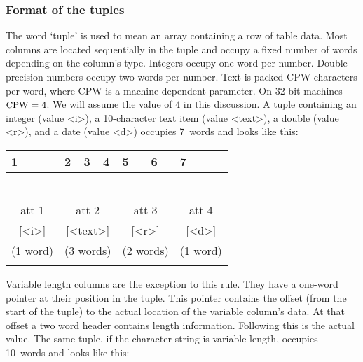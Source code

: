 \documentclass[11pt,a4paper]{report}
\def\I{\index}
\begin{document}
\medskip
 
\subsubsection{Format of the tuples}
%
\I{tuple}
The word `tuple' is used to mean an array containing a row of table data.
Most columns are located sequentially in the tuple and
occupy a fixed number of words depending on the column's type.
Integers occupy one word per number.  Double precision numbers
occupy two words per number.  Text is packed {\small CPW}
characters per word, where {\small CPW} is a machine dependent
parameter.  On 32-bit machines $\mbox{\small CPW}=4$. We will
assume the value of 4 in this discussion.
A tuple containing an integer (value <i>), a 10-character text item
(value <text>),
a double (value <r>),
and a date (value <d>) occupies 7~words and looks like this:
 
\smallskip
{\centering\small{}
 \def\strut{\rule{0pt}{2pt}} \def\Strut{\rule{0pt}{12pt}}
 \def\fl{\multicolumn{1}{|l|}}
\begin{tabular}{|c|c|c|c|c|c|c|}
 \fl{1}&\fl{2}&\fl{3}&\fl{4}&\fl{5}&\fl{6}&\fl{7}\\
 \hline
   \rule{38pt}{0pt}&
   \rule{38pt}{0pt}&
   \rule{38pt}{0pt}&
   \rule{38pt}{0pt}&
   \rule{38pt}{0pt}&
   \rule{38pt}{0pt}&
   \rule{38pt}{0pt}\\
 \Strut att 1&
 \multicolumn{3}{|c|}{att 2}&
 \multicolumn{2}{|c|}{att 3}&
 att 4\\
 \Strut [<i>]&
 \multicolumn{3}{|c|}{[<text>]}&
 \multicolumn{2}{|c|}{[<r>]}&
 [<d>]\\
 \Strut (1 word)&
 \multicolumn{3}{|c|}{(3 words)}&
 \multicolumn{2}{|c|}{(2 words)}&
 (1 word)\\
 &&&&&&\\
 \hline
\end{tabular}
 \par}
 
\medskip
Variable length columns are the exception to this rule.
They have a one-word pointer at their position in the tuple.
This pointer contains the offset (from the start of the tuple)
to the actual location of the variable column's data.
At that offset a two word header contains length information.
Following this is the actual value.
The same tuple, if the character string is variable length,
occupies 10~words and
looks like this:
 
\end{document}
